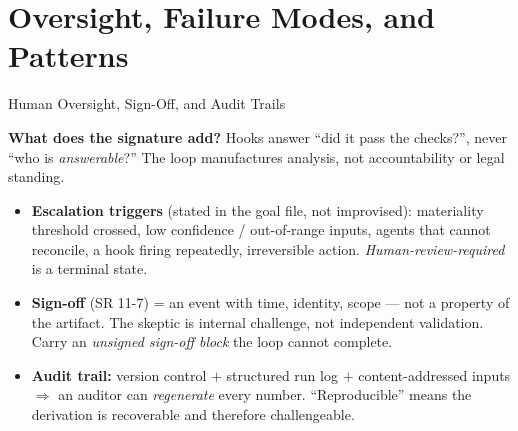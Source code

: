 \documentclass[9pt,t]{beamer}
\begin{document}
\section{Oversight, Failure Modes, and Patterns}

\begin{frame}{Human Oversight, Sign-Off, and Audit Trails}

\textbf{What does the signature add?} Hooks answer ``did it pass the checks?'',
never ``who is \emph{answerable}?'' The loop manufactures analysis, not
accountability or legal standing.

\medskip
\begin{itemize}
  \item \textbf{Escalation triggers} (stated in the goal file, not improvised):
        materiality threshold crossed, low confidence / out-of-range inputs,
        agents that cannot reconcile, a hook firing repeatedly, irreversible
        action. \emph{Human-review-required} is a terminal state.
  \item \textbf{Sign-off} (SR 11-7) = an event with time, identity, scope --- not
        a property of the artifact. The skeptic is internal challenge, \alert{not}
        independent validation. Carry an \emph{unsigned sign-off block} the loop
        cannot complete.
  \item \textbf{Audit trail:} version control $+$ structured run log $+$
        content-addressed inputs $\Rightarrow$ an auditor can \emph{regenerate}
        every number. ``Reproducible'' means the derivation is recoverable and
        therefore challengeable.
\end{itemize}
\end{frame}
\end{document}
